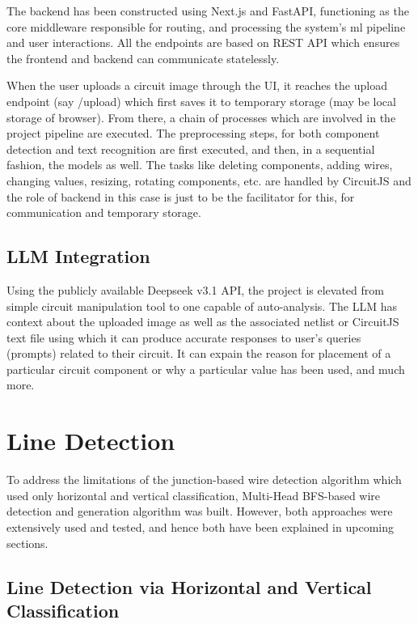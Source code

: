 The backend has been constructed using Next.js and FastAPI, functioning as the core middleware responsible for routing, and processing the system's \gls{ml} pipeline and user interactions. All the endpoints are based on REST API which ensures the frontend and backend can communicate statelessly.

When the user uploads a circuit image through the UI, it reaches the upload endpoint (say /upload) which first saves it to temporary storage (may be local storage of browser). From there, a chain of processes which are involved in the project pipeline are executed. The preprocessing steps, for both component detection and text recognition are first executed, and then, in a sequential fashion, the models as well. The tasks like deleting components, adding wires, changing values, resizing, rotating components, etc. are handled by CircuitJS and the role of backend in this case is just to be the facilitator for this, for communication and temporary storage.

\subsection{LLM Integration}

Using the publicly available Deepseek v3.1 API, the project is elevated from simple circuit manipulation tool to one capable of auto-analysis. The LLM has context about the uploaded image as well as the associated netlist or CircuitJS text file using which it can produce accurate responses to user's queries (prompts) related to their circuit. It can expain the reason for placement of a particular circuit component or why a particular value has been used, and much more.

\section{Line Detection}

To address the limitations of the junction-based wire detection algorithm which used only horizontal and vertical classification, Multi-Head BFS-based wire detection and generation algorithm was built. However, both approaches were extensively used and tested, and hence both have been explained in upcoming sections. 

\subsection{Line Detection via Horizontal and Vertical Classification}

